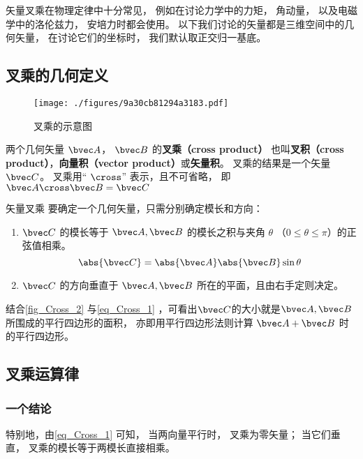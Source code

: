 

矢量叉乘在物理定律中十分常见， 例如在讨论力学中的力矩， 角动量， 以及电磁学中的洛伦兹力， 安培力时都会使用。 以下我们讨论的矢量都是三维空间中的几何矢量， 在讨论它们的坐标时， 我们默认取正交归一基底。

\subsection{叉乘的几何定义}

\begin{figure}[ht]
\centering
\texttt{[image: ./figures/9a30cb81294a3183.pdf]}
\caption{叉乘的示意图} \label{fig_Cross_2}
\end{figure}

两个几何矢量 $\bvec A$，  $\bvec B$ 的\textbf{叉乘（cross product）} 也叫\textbf{叉积（cross product）}，\textbf{向量积（vector product）}或\textbf{矢量积}。 叉乘的结果是一个矢量 $\bvec C$。  叉乘用“ $\cross$” 表示，且不可省略， 即 $ \bvec A \cross \bvec B = \bvec C$

\begin{definition}{矢量叉乘}\label{def_Cross_1}
要确定一个几何矢量，只需分别确定模长和方向：
\begin{enumerate}
\item $\bvec C$ 的模长等于 $\bvec A, \bvec B$ 的模长之积与夹角 $\theta$ （$0 \leqslant \theta \leqslant \pi$）的正弦值相乘。
\begin{equation}\label{eq_Cross_1}
\abs{\bvec C}  = \abs{\bvec A} \abs{\bvec B} \sin\theta 
\end{equation}
\item $\bvec C$ 的方向垂直于 $\bvec A, \bvec B$ 所在的平面，且由右手定则决定。
\end{enumerate}
\end{definition}

结合\autoref{fig_Cross_2} 与\autoref{eq_Cross_1} ，可看出$\bvec C$的大小就是$\bvec A, \bvec B$所围成的平行四边形的面积， 亦即用平行四边形法则计算 $\bvec A + \bvec B$ 时的平行四边形。

\subsection{叉乘运算律}
\subsubsection{一个结论}
特别地，由\autoref{eq_Cross_1} 可知， 当两向量平行时， 叉乘为零矢量； 当它们垂直， 叉乘的模长等于两模长直接相乘。%

